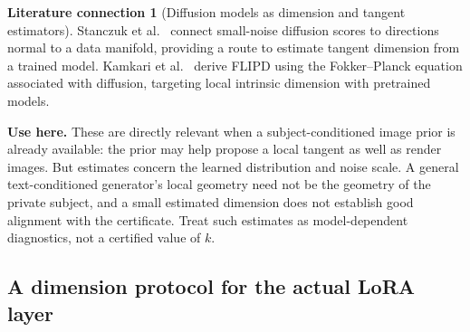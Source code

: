 \documentclass[11pt,a4paper]{article}
\theoremstyle{definition}
\theoremstyle{definition}
\newtheorem{literature}[theorem]{Literature connection}
\theoremstyle{remark}\newtheorem{remark}[theorem]{Remark}
\begin{document}
\begin{literature}[Diffusion models as dimension and tangent estimators]\label{lit:diffdimension}
Stanczuk et al.~\cite{stanczuk} connect small-noise diffusion scores to directions normal to a data manifold, providing a route to estimate tangent dimension from a trained model. Kamkari et al.~\cite{flipd} derive FLIPD using the Fokker--Planck equation associated with diffusion, targeting local intrinsic dimension with pretrained models.

\textbf{Use here.} These are directly relevant when a subject-conditioned image prior is already available: the prior may help propose a local tangent as well as render images. But estimates concern the learned distribution and noise scale. A general text-conditioned generator's local geometry need not be the geometry of the private subject, and a small estimated dimension does not establish good alignment with the certificate. Treat such estimates as model-dependent diagnostics, not a certified value of $k$.
\end{literature}

\subsection{A dimension protocol for the actual LoRA layer}
\end{document}
